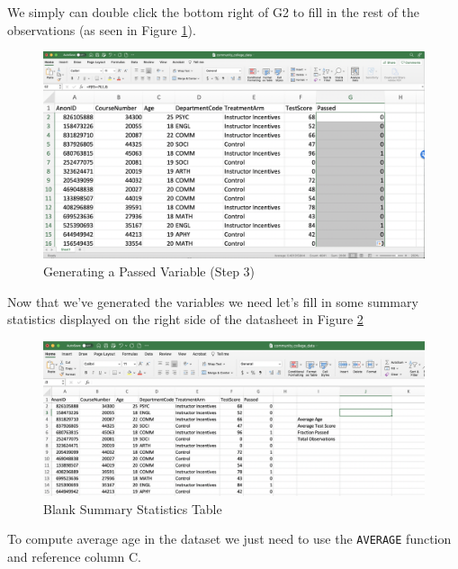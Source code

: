 \documentclass[
]{book}
\begin{document}
We simply can double click the bottom right of G2 to fill in the rest of the observations (as seen in Figure \ref{fig:passed2}).

\begin{figure}

{\centering \includegraphics[width=1\linewidth]{images/01_passed2} 

}

\caption{Generating a Passed Variable (Step 3)}\label{fig:passed2}
\end{figure}

Now that we've generated the variables we need let's fill in some summary statistics displayed on the right side of the datasheet in Figure \ref{fig:sumstats1}

\begin{figure}

{\centering \includegraphics[width=1\linewidth]{images/01_sumstats1} 

}

\caption{Blank Summary Statistics Table}\label{fig:sumstats1}
\end{figure}

To compute average age in the dataset we just need to use the \texttt{AVERAGE} function and reference column C.
\end{document}
